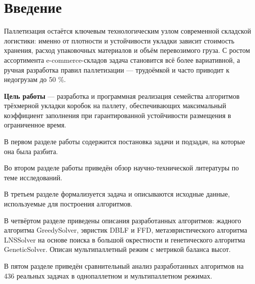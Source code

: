\chapter*{Введение}
\label{cha:intro}

Паллетизация остаётся ключевым технологическим узлом современной складской логистики: именно от плотности и устойчивости укладки зависит стоимость хранения, расход упаковочных материалов и объём перевозимого груза. С ростом ассортимента e-commerce-складов задача становится всё более вариативной, а ручная разработка правил паллетизации — трудоёмкой и часто приводит к недогрузам до 50 \%.

\textbf{Цель работы} --- разработка и программная реализация семейства алгоритмов трёхмерной укладки коробок на паллету, обеспечивающих максимальный коэффициент заполнения при гарантированной устойчивости размещения в ограниченное время.

В первом разделе работы содержится постановка задачи и подзадач, на которые она была разбита.

Во втором разделе работы приведён обзор научно-технической литературы по теме исследований.

В третьем разделе формализуется задача и описываются исходные данные, используемые для построения алгоритмов.
 
В четвёртом разделе приведены описания разработанных алгоритмов: жадного алгоритма GreedySolver, эвристик DBLF и FFD, метаэвристического алгоритма LNSSolver на основе поиска в большой окрестности и генетического алгоритма GeneticSolver. Описан мультипаллетный режим с метрикой баланса высот.

В пятом разделе приведён сравнительный анализ разработанных алгоритмов на 436 реальных задачах в однопаллетном и мультипаллетном режимах.
